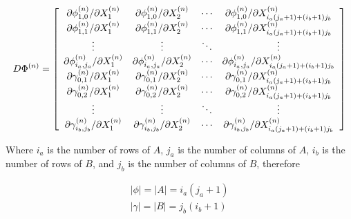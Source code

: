 \begin{equation} \label{Jacobian)} 
    D\Phi ^{\left(n\right)} =\left[\begin{array}{cccc} 
    {\partial \phi_{1,0}^{(n)} / \partial X_{1}^{(n)} } 
    & {\partial \phi_{1,0}^{(n)} / \partial X_{2}^{(n)} } 
    & {\cdots } 
    & {\partial \phi_{1,0}^{(n)} / \partial X_{i_{a} \left(j_{a} +1\right)+\left(i_{b} + 1\right)j_{b} }^{(n)} } \\ 
    
    {\partial \phi_{1,1}^{(n)} / \partial X_{1}^{(n)} } 
    & {\partial \phi_{1,1}^{(n)} / \partial X_{2}^{(n)} } 
    & {\cdots } 
    & {\partial \phi_{1,1}^{(n)} / \partial X_{i_{a} \left(j_{a} +1\right)+\left(i_{b} +1\right)j_{b} }^{(n)} } \\ 
    
    {\vdots } & {\vdots } & {\ddots } & {\vdots } \\ 
    
    {\partial \phi_{i_{a} ,j_{a} }^{(n)} / \partial X_{1}^{(n)} } 
    & {\partial \phi_{i_{a},j_{a} }^{(n)} / \partial X_{2}^{(n)} } 
    & {\cdots } 
    & {\partial \phi_{i_{a} ,j_{a}}^{(n)} / \partial X_{i_{a} \left(j_{a} +1\right)+\left(i_{b} +1\right)j_{b} }^{(n)} } \\

    {\partial \gamma_{0,1}^{(n)} / \partial X_{1}^{(n)}} 
    & {\partial \gamma_{0,1}^{(n)} / \partial X_{2}^{(n)} } 
    & {\cdots } 
    &{\partial \gamma_{0,1}^{(n)} / \partial X_{i_{a} \left(j_{a} +1\right)+\left(i_{b}+1\right)j_{b} }^{(n)} } \\

    {\partial \gamma_{0,2}^{(n)} / \partial X_{1}^{(n)} } 
    & {\partial \gamma_{0,2}^{(n)} / \partial X_{2}^{(n)}} 
    & {\cdots } 
    & {\partial \gamma_{0,2}^{(n)} / \partial X_{i_{a} \left(j_{a}+1\right)+\left(i_{b} +1\right)j_{b} }^{\left(n\right)}} \\ 
    
    {\vdots } & {\vdots } & {\ddots } & {\vdots } \\

    {\partial \gamma_{i_{b} ,j_{b}}^{(n)} / \partial X_{1}^{(n)} } 
    & {\partial \gamma_{i_{b} ,j_{b} }^{(n)} / \partial X_{2}^{(n)} }
    & {\cdots } 
    & {\partial \gamma_{i_{b} ,j_{b} }^{(n)} / \partial X_{i_{a} \left(j_{a}+1\right)+\left(i_{b} +1\right)j_{b} }^{(n)} } 
\end{array} \right] \end{equation}

Where $i_{a} $ is the number of rows of $A$, $j_{a} $ is the number of columns
of $A$, $i_{b} $ is the number of rows of $B$, and $j_{b} $ is the number of
columns of $B$, therefore

\begin{equation} \label{ZEqnNum134946} \begin{array}{l} {\left|\phi
\right|=\left|A\right|=i_{a} \left(j_{a} +1\right)} \\ {\left|\gamma
\right|=\left|B\right|=j_{b} \left(i_{b} +1\right)} \end{array} \end{equation}


